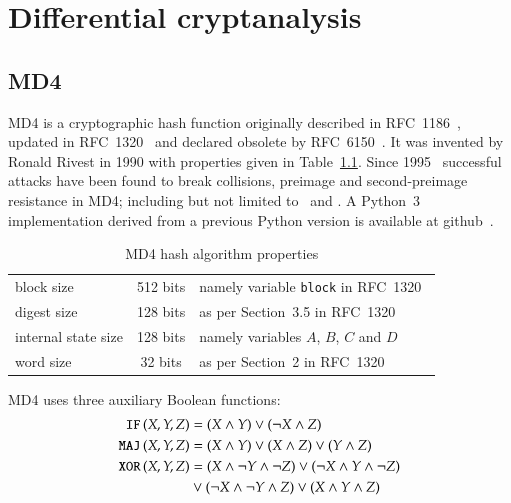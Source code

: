 \renewcommand*\chappic{img/diff-crypt.pdf}
\renewcommand*\chapquote{Just because it's automatic doesn't mean it works.}
\renewcommand*\chapquotesrc{Daniel J. Bernstein}
\chapter{Differential cryptanalysis}
\label{ch:dc}
%
\section{MD4}
\label{sec:dc-md4}
%
MD4 is a cryptographic hash function originally described in RFC~1186~\cite{rfc1186},
updated in RFC~1320~\cite{rfc1320} and declared obsolete by RFC~6150~\cite{rfc6150}. It was
invented by Ronald Rivest in 1990 with properties given in Table~\ref{tab:md4}.
Since 1995~\cite{Dobbertin1998} successful attacks have been found to break collisions,
preimage and second-preimage resistance in MD4; including but not limited to~\cite{md4-2007} and
\cite{cryptoeprint:2005:151}. A Python~3 implementation derived from a previous Python version
is available at github~\cite{md4-py3k}.

\begin{table}[h]
  \begin{center}
    \begin{tabular}{lcl}
      block size           & 512 bits       & namely variable \texttt{block} in RFC~1320~\cite{rfc1320} \\
      digest size          & 128 bits       & as per Section~3.5 in RFC~1320~\cite{rfc1320} \\
      internal state size  & 128 bits       & namely variables $A$, $B$, $C$ and $D$ \\
      word size            & 32 bits        & as per Section~2 in RFC~1320~\cite{rfc1320} \\
    \end{tabular}
    \caption{MD4 hash algorithm properties}
    \label{tab:md4}
  \end{center}
\end{table}

MD4 uses three auxiliary Boolean functions:
\begin{align}
  \operatorname{\texttt{IF\,}}(X,Y,Z) &= (X \land Y) \lor (\neg X \land Z) \\
  \operatorname{\texttt{MAJ\,}}(X,Y,Z) &= (X \land Y) \lor (X \land Z) \lor (Y \land Z) \\
  \operatorname{\texttt{XOR\,}}(X,Y,Z) &= (X \land \neg Y \land \neg Z) \lor (\neg X \land Y \land \neg Z) \nonumber\\
              &\lor (\neg X \land \neg Y \land Z) \lor (X \land Y \land Z)
\end{align}

